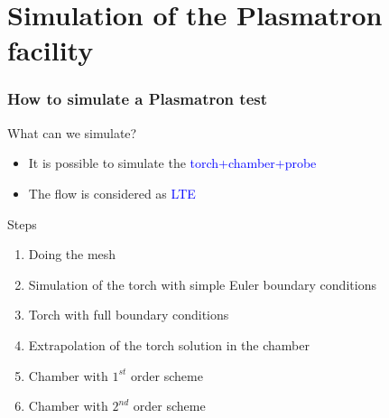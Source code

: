 \documentclass[compress,10pt]{beamer}
\begin{document}
\section{Simulation of the Plasmatron facility}
\begin{frame}[fragile]
 \frametitle{How to simulate a Plasmatron test}
\begin{block}{What can we simulate?}
\begin{itemize}
\item It is possible to simulate the \textcolor{blue}{torch+chamber+probe}
\item The flow is considered as \textcolor{blue}{LTE}
\end{itemize}
\end{block}
\begin{block}{Steps}
\begin{enumerate}
 \item Doing the mesh
 \item Simulation of the torch with simple Euler boundary conditions
 \item Torch with full boundary conditions
 \item Extrapolation of the torch solution in the chamber
 \item Chamber with $1^{st}$ order scheme
 \item Chamber with $2^{nd}$ order scheme
\end{enumerate}
\end{block}
\end{frame}
\end{document}

